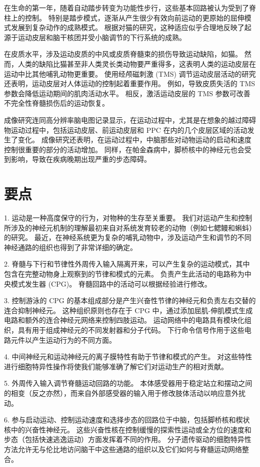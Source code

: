 在生命的第一年，随着自动踏步转变为功能性步行，这些基本回路被认为受到了脊柱上的控制。 特别是踏步模式，逐渐从产生很少有效向前运动的更原始的屈伸模式发展到复杂动作的成熟模式。 根据对猫的研究，这种适应似乎合理地反映了起源于运动皮层和脑干核团并受小脑调节的下行系统的成熟。

在皮质水平，涉及运动皮质的中风或皮质脊髓束的损伤导致运动缺陷，如猫。 然而，人类的缺陷比猫甚至非人类灵长类动物要严重得多，这表明人类的运动皮层在运动中比其他哺乳动物更重要。 使用经颅磁刺激 (TMS) 调节运动皮层活动的研究还表明，运动皮层对人体运动的控制起着重要作用。 例如，导致皮质失活的 TMS 参数会降低运动期间的肌肉活动水平。 相反，激活运动皮层的 TMS 参数可改善不完全性脊髓损伤后的运动恢复。

成像研究连同高分辨率脑电图记录显示，在运动过程中，尤其是在想象的越过障碍物运动过程中，包括运动皮层、前运动皮层和 PPC 在内的几个皮层区域的活动发生了变化。 成像研究还表明，在运动过程中，中脑那些对动物运动的启动和速度控制很重要的部分的活动增加。 同样，在帕金森病中，脚桥核中的神经元也会受到影响，导致在疾病晚期出现严重的步态障碍。

\section{要点}


1. 运动是一种高度保守的行为，对物种的生存至关重要。 我们对运动产生和控制所涉及的神经元机制的理解最初来自对系统发育较老的动物（例如七鳃鳗和蝌蚪）的研究。 最近，在神经系统更为复杂的哺乳动物中，涉及运动产生和调节的不同神经通路的组织也得到了非常详细的确定。 

2. 脊髓与下行和节律性外周传入输入隔离开来，可以产生复杂的运动模式，其中包含在完整动物身上观察到的节律和模式的元素。 负责产生此活动的电路称为中央模式发生器 (CPG)。 脊髓回路中的活动可以根据经验进行修改。 

3. 控制游泳的 CPG 的基本组成部分是产生兴奋性节律的神经元和负责左右交替的连合抑制神经元。 这种组织原则也存在于 CPG 中，通过添加屈肌-伸肌模式生成电路和额外的连合神经元网络来控制四肢运动。 运动网络中的电路具有模块化组织，具有用于组成神经元的不同发射器和分子代码。 下行命令信号作用于这些电路元件以产生运动行为的不同方面。 

4. 中间神经元和运动神经元的离子膜特性有助于节律和模式的产生。 对这些特性进行细胞特异性操作将使我们能够准确了解它们对运动生产的相对贡献。 

5. 外周传入输入调节脊髓运动回路的功能。 本体感受器用于稳定站立和摆动之间的相变（反之亦然），而来自外部感受器的输入用于修改肢体活动以响应意外扰动。 

6. 参与启动运动、控制运动速度和选择步态的回路位于中脑，包括脚桥核和楔状核中的兴奋性神经元。 这些兴奋性核在控制缓慢的探索性运动或全方位的速度和步态（包括快速逃逸运动）方面发挥着不同的作用。 分子遗传驱动的细胞特异性方法允许无与伦比地访问脑干中这些通路的组织以及它们如何与脊髓运动网络整合。 

